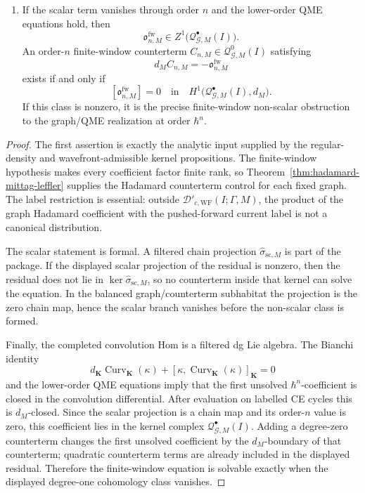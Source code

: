 \begin{thm}
\begin{enumerate}[label=(\arabic*)]
    \item If the scalar term vanishes through order \(n\) and the
    lower-order QME equations hold, then
    \[
      \mathfrak o^{\mathrm{fw}}_{n,M}
        \in Z^1\bigl(\mathcal Q^\bullet_{\mathcal G,M}(I)\bigr).
    \]
    An order-\(n\) finite-window counterterm
    \(C_{n,M}\in\mathcal Q^0_{\mathcal G,M}(I)\) satisfying
    \[
      d_M C_{n,M}=-\mathfrak o^{\mathrm{fw}}_{n,M}
    \]
    exists if and only if
    \[
      [\mathfrak o^{\mathrm{fw}}_{n,M}]
        =0
        \quad\text{in}\quad
      H^1\bigl(\mathcal Q^\bullet_{\mathcal G,M}(I),d_M\bigr).
    \]
    If this class is nonzero, it is the precise finite-window non-scalar
    obstruction to the graph/QME realization at order \(\hbar^n\).
  \end{enumerate}
\end{thm}

\begin{proof}
  The first assertion is exactly the analytic input supplied by the
  regular-density and wavefront-admissible kernel propositions.  The
  finite-window hypothesis makes every coefficient factor finite rank, so
  Theorem~\ref{thm:hadamard-mittag-leffler} supplies the Hadamard
  counterterm control for each fixed graph.  The label restriction is
  essential: outside
  \(\mathcal D'_{c,\mathrm{WF}}(I;\Gamma,M)\), the product of the graph
  Hadamard coefficient with the pushed-forward current label is not a
  canonical distribution.

  The scalar statement is formal.  A filtered chain projection
  \(\widehat\sigma_{\mathrm{sc},M}\) is part of the package.  If the
  displayed scalar projection of the residual is nonzero, then the
  residual does not lie in
  \(\ker\widehat\sigma_{\mathrm{sc},M}\), so no counterterm inside that
  kernel can solve the equation.  In the balanced graph/counterterm
  subhabitat the projection is the zero chain map, hence the scalar branch
  vanishes before the non-scalar class is formed.

  Finally, the completed convolution Hom is a filtered dg Lie algebra.
  The Bianchi identity
  \[
    d_{\mathbf K}\operatorname{Curv}_{\mathbf K}(\kappa)
      +[\kappa,\operatorname{Curv}_{\mathbf K}(\kappa)]_{\mathbf K}=0
  \]
  and the lower-order QME equations imply that the first unsolved
  \(\hbar^n\)-coefficient is closed in the convolution differential.
  After evaluation on labelled CE cycles this is \(d_M\)-closed.
  Since the scalar projection
  is a chain map and its order-\(n\) value is zero, this coefficient lies
  in the kernel complex \(\mathcal Q^\bullet_{\mathcal G,M}(I)\).  Adding a
  degree-zero counterterm changes the first unsolved coefficient by the
  \(d_M\)-boundary of that counterterm; quadratic counterterm terms are
  already included in the displayed residual.  Therefore the finite-window
  equation is solvable exactly when the displayed degree-one cohomology
  class vanishes.
\end{proof}

